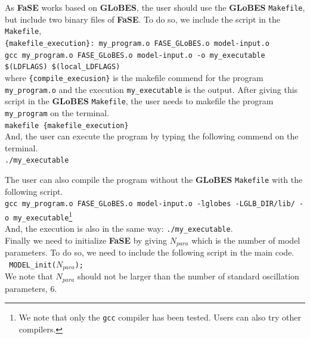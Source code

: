 \documentclass[aps,prd,nofootinbib,preprint]{revtex4}
\begin{document}
As \textbf{FaSE} works based on \textbf{GLoBES}, the user should use the \textbf{GLoBES} \texttt{Makefile}, but include two binary files of \textbf{FaSE}. To do so, we include the script in the \texttt{Makefile},\vspace{0.2cm}\\
\texttt{\{makefile\_execution\}: my\_program.o  FASE\_GLoBES.o model-input.o\\
	gcc my\_program.o  FASE\_GLoBES.o model-input.o -o my\_executable  \$(LDFLAGS) \$(local\_LDFLAGS)}\vspace{0.2cm}\\	
where \texttt{\{compile\_execusion\}} is the makefile commend for the program \texttt{my\_program.o} and the execution \texttt{my\_executable} is the output. After giving this script in the \textbf{GLoBES} \texttt{Makefile}, the user needs to makefile the program \texttt{my\_program} on the terminal.\vspace{0.2cm}\\
\texttt{makefile \{makefile\_execution\}}\vspace{0.2cm}\\
And, the user can execute the program by typing the following commend on the terminal.\vspace{0.2cm}\\ 
\texttt{./my\_executable}%

The user can also compile the program without the \textbf{GLoBES} \texttt{Makefile} with the following script.\vspace{0.2cm}\\
\texttt{gcc my\_program.o FASE\_GLoBES.o model-input.o -lglobes -LGLB\_DIR/lib/ -o my\_executable}\footnote{We note that only the \texttt{gcc} compiler has been tested. Users can also try other compilers.}\vspace{0.2cm}\\
And, the execution is also in the same way: \texttt{./my\_executable}.\\

Finally we need to initialize \textbf{FaSE} by giving $N_{para}$ which is the number of model parameters. To do so, we need to include the following script in the main code.\\
\texttt{    MODEL\_init($N_{para}$); }\vspace{0.2cm}\\ 
We note that $N_{para}$ should not be larger than the number of standard oscillation parameters, $6$.
\end{document}
